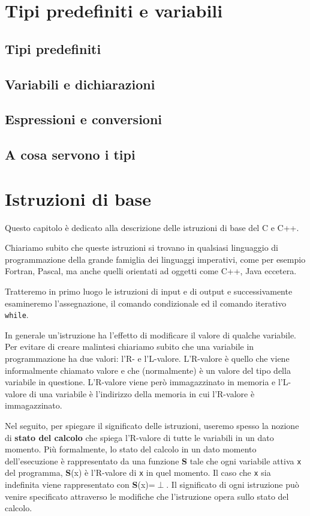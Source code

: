 \documentclass[a4paper,12pt]{book}
\begin{document}
\chapter{Tipi predefiniti e variabili}
\section{Tipi predefiniti}
\section{Variabili e dichiarazioni}
\section{Espressioni e conversioni}
\section{A cosa servono i tipi}

\chapter{Istruzioni di base}
Questo capitolo è dedicato alla descrizione delle istruzioni di base del C e C++.

\noindent Chiariamo subito che queste istruzioni si trovano in qualsiasi linguaggio di programmazione della grande famiglia dei linguaggi imperativi, come per esempio Fortran, Pascal, ma anche quelli orientati ad oggetti come C++, Java eccetera.

\noindent Tratteremo in primo luogo le istruzioni di input e di output e successivamente esamineremo l'assegnazione, il comando condizionale ed il comando iterativo \texttt{while}.

In generale un'istruzione ha l'effetto di modificare il valore di qualche variabile.
Per evitare di creare malintesi chiariamo subito che una variabile in programmazione ha due valori: l'R- e l'L-valore.
L'R-valore è quello che viene informalmente chiamato valore e che (normalmente) è un valore del tipo della variabile in questione.
L'R-valore viene però immagazzinato in memoria e l'L-valore di una variabile è l'indirizzo della memoria in cui l'R-valore è immagazzinato.

Nel seguito, per spiegare il significato delle istruzioni, useremo spesso la nozione di \textbf{stato del calcolo} che spiega l'R-valore di tutte le variabili in un dato momento.
Più formalmente, lo stato del calcolo in un dato momento dell'esecuzione è rappresentato da una funzione \textbf{S} tale che ogni variabile attiva \texttt{x} del programma, \textbf{S}(x) è l'R-valore di \texttt{x} in quel momento.
Il caso che \texttt{x} sia indefinita viene rappresentato con \textbf{S}(x)=$\perp$.
Il significato di ogni istruzione può venire specificato attraverso le modifiche che l'istruzione opera sullo stato del calcolo.
\end{document}
